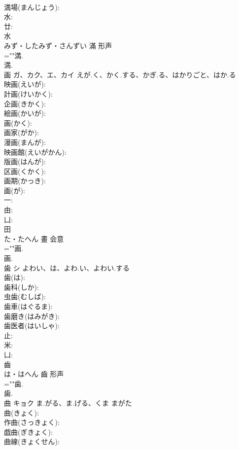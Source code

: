 \documentclass[8pt]{extreport}
\begin{document}
\begin{CJK}{UTF8}{min}
\\	満場(まんじょう): 
\\	水: 
\\	廿: 
\\	水	
\\	みず・したみず・さんずい	滿	形声 
\\	=""満.
\\	満.
\\	画	ガ、カク、エ、カイ	えが.く、かく.する、かぎ.る、はかりごと、はか.る		
\\	映画(えいが): 
\\	計画(けいかく): 
\\	企画(きかく): 
\\	絵画(かいが): 
\\	画(かく): 
\\	画家(がか): 
\\	漫画(まんが): 
\\	映画館(えいがかん): 
\\	版画(はんが): 
\\	区画(くかく): 
\\	画期(かっき): 
\\	画(が): 
\\	一: 
\\	由: 
\\	凵: 
\\	田	
\\	た・たへん	畫	会意 
\\	=""画.
\\	画.
\\	歯	シ	よわい、は、よわ.い、よわい.する		
\\	歯(は): 
\\	歯科(しか): 
\\	虫歯(むしば): 
\\	歯車(はぐるま): 
\\	歯磨き(はみがき): 
\\	歯医者(はいしゃ): 
\\	止: 
\\	米: 
\\	凵: 
\\	齒	
\\	は・はへん	齒	形声 
\\	=""歯.
\\	歯.
\\	曲	キョク	ま.がる、ま.げる、くま	まがた	
\\	曲(きょく): 
\\	作曲(さっきょく): 
\\	戯曲(ぎきょく): 
\\	曲線(きょくせん): 

\end{CJK}
\end{document}

